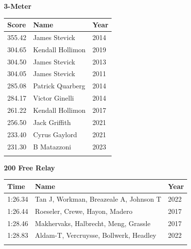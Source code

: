 \vspace{1.2em}
\noindent\begin{minipage}[t]{0.98\textwidth}
\centering
\textbf{\textcolor{teamprimary}{3-Meter}}\par
\vspace{0.5em}
\centering
\small
\renewcommand{\arraystretch}{1.0}
\setlength{\tabcolsep}{4pt}
\begin{tabular}{@{}p{1.8cm}p{3.0cm}p{1.0cm}@{}}
\toprule
\textbf{Score} & \textbf{Name} & \textbf{Year} \\
\midrule
355.42 & James Stevick & 2014 \\
304.65 & Kendall Hollimon & 2019 \\
304.50 & James Stevick & 2013 \\
304.05 & James Stevick & 2011 \\
285.08 & Patrick Quarberg & 2014 \\
284.17 & Victor Ginelli & 2014 \\
261.22 & Kendall Hollimon & 2017 \\
256.50 & Jack Griffith & 2021 \\
233.40 & Cyrus Gaylord & 2021 \\
231.30 & B Matazzoni & 2023 \\
\bottomrule
\vspace{0.5em}
\end{tabular}
\end{minipage}
\vspace{1.2em}
\noindent\begin{minipage}[t]{0.98\textwidth}
\centering
\textbf{\textcolor{teamprimary}{200 Free Relay}}\par
\vspace{0.5em}
\centering
\small
\renewcommand{\arraystretch}{1.0}
\setlength{\tabcolsep}{4pt}
\begin{tabular}{@{}p{4.5cm}p{8.5cm}p{2.5cm}@{}}
\toprule
\textbf{Time} & \textbf{Name} & \textbf{Year} \\
\midrule
1:26.34 & Tan J, Workman, Breazeale A, Johnson T & 2022 \\
1:26.44 & Roeseler, Crewe, Hayon, Madero & 2017 \\
1:28.46 & Makhervaks, Halbrecht, Meng, Grassle & 2017 \\
1:28.83 & Aldam-T, Vercruysse, Bollwerk, Headley & 2022 \\
\bottomrule
\vspace{0.5em}
\end{tabular}
\end{minipage}
